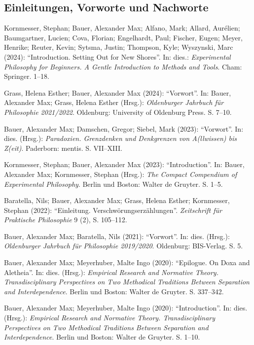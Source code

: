 \documentclass[a4paper,10pt]{article}
\newenvironment{literature}{%
   \parskip6pt\parindent0pt\raggedright
   \def\lititem{\hangindent=1cm\hangafter1}}{%
   \par\ignorespaces}
\begin{document}
\subsection*{Einleitungen, Vorworte und Nachworte}
\begin{literature}
\lititem Kornmesser, Stephan; Bauer, Alexander Max; Alfano, Mark; Allard, Aurélien; Baumgartner, Lucien; Cova, Florian; Engelhardt, Paul; Fischer, Eugen; Meyer, Henrike; Reuter, Kevin; Sytsma, Justin; Thompson, Kyle; Wyszynski, Marc (2024): \enquote{Introduction. Setting Out for New Shores}. In: dies.: \textit{Experimental Philosophy for Beginners. A Gentle Introduction to Methods and Tools}. Cham: Springer. 1--18.

\lititem Grass, Helena Esther; Bauer, Alexander Max (2024): \enquote{Vorwort}. In: Bauer, Alexander Max; Grass, Helena Esther (Hrsg.): \textit{Oldenburger Jahrbuch für Philosophie 2021/2022}. Oldenburg: University of Oldenburg Press. S. 7--10.

\lititem Bauer, Alexander Max; Damschen, Gregor; Siebel, Mark (2023): \enquote{Vorwort}. In: dies. (Hrsg.): \textit{Paradoxien. Grenzdenken und Denkgrenzen von A(llwissen) bis Z(eit)}. Paderborn: mentis. S. VII--XIII.

\lititem Kornmesser, Stephan; Bauer, Alexander Max (2023): \enquote{Introduction}. In: Bauer, Alexander Max; Kornmesser, Stephan (Hrsg.): \textit{The Compact Compendium of Experimental Philosophy}. Berlin und Boston: Walter de Gruyter. S. 1--5.

\lititem Baratella, Nils; Bauer, Alexander Max; Grass, Helena Esther; Kornmesser, Stephan (2022): \enquote{Einleitung. Verschwörungserzählungen}. \textit{Zeitschrift für Praktische Philosophie} 9 (2), S. 105--112.

\lititem Bauer, Alexander Max; Baratella, Nils (2021): \enquote{Vorwort}. In: dies. (Hrsg.): \textit{Oldenburger Jahrbuch für Philosophie 2019/2020}. Oldenburg: BIS-Verlag. S. 5.

\lititem Bauer, Alexander Max; Meyerhuber, Malte Ingo (2020): \enquote{Epilogue. On Doxa and Aletheia}. In: dies. (Hrsg.): \textit{Empirical Research and Normative Theory. Transdisciplinary Perspectives on Two Methodical Traditions Between Separation and Interdependence}. Berlin und Boston: Walter de Gruyter. S. 337--342.

\lititem Bauer, Alexander Max; Meyerhuber, Malte Ingo (2020): \enquote{Introduction}. In: dies. (Hrsg.): \textit{Empirical Research and Normative Theory. Transdisciplinary Perspectives on Two Methodical Traditions Between Separation and Interdependence}. Berlin und Boston: Walter de Gruyter. S. 1--10.


\end{literature}
\end{document}
